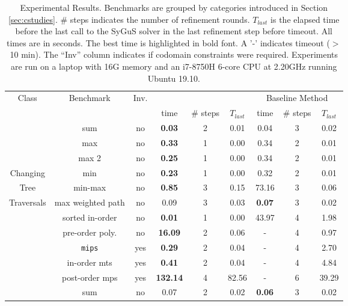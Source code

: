 \begin{table}
	\caption{Experimental Results.  Benchmarks are grouped by categories introduced in Section \ref{sec:cstudies}. \# steps indicates the number of refinement rounds. $T_{last}$ is the elapsed time before the last call to the SyGuS solver in the last refinement step before timeout. All times are in seconds. The best time is highlighted in bold font.  A '-' indicates timeout ($>$ 10 min). The ``Inv'' column indicates if codomain constraints were required. Experiments are run on a laptop with 16G memory and an i7-8750H 6-core CPU at 2.20GHz running Ubuntu 19.10.}\label{table:experiments}
	{
		\begin{tabular}[h]{|c|c|c|c|c|c||c|c|c|}
			\hline
			 \multirow{2}{*}{Class} &                 \multirow{2}{*}{Benchmark} &                   \multirow{2}{*}{Inv.} &                    \multicolumn{3}{c||}{\tool} &                     \multicolumn{3}{c|}{Baseline Method}\\ 
			\cline{4-9}
			 &   & & time & \# steps & $T_{last}$ & time & \# steps & $T_{last}$\\ 
			\hline
			 & sum & no & {\bfseries 0.03} & 2 & 0.01 & 0.04 & 3 & 0.02\\ 
			 & max & no & {\bfseries 0.33} & 1 & 0.00 & 0.34 & 2 & 0.01\\ 
			 & max 2 & no & {\bfseries 0.25} & 1 & 0.00 & 0.34 & 2 & 0.01\\ 
			Changing & min & no & {\bfseries 0.23} & 1 & 0.00 & 0.32 & 2 & 0.01\\ 
			Tree & min-max & no & {\bfseries 0.85} & 3 & 0.15 & 73.16 & 3 & 0.06\\ 
			Traversals & max weighted path & no & 0.09 & 3 & 0.03 & {\bfseries 0.07} & 3 & 0.02\\ 
			 & sorted in-order & no & {\bfseries 0.01} & 1 & 0.00 & 43.97 & 4 & 1.98\\ 
			 & pre-order poly. & no & {\bfseries 16.09} & 2 & 0.06 & - & 4 & 0.97\\ 
			 & {\tt mips} & yes & {\bfseries 0.29} & 2 & 0.04 & - & 4 & 2.70\\ 
			 & in-order mts & yes & {\bfseries 0.41} & 2 & 0.04 & - & 4 & 4.84\\ 
			 & post-order mps & yes & {\bfseries 132.14} & 4 & 82.56 & - & 6 & 39.29\\ 
			\hline
			 & sum & no & 0.07 & 2 & 0.02 & {\bfseries 0.06} & 3 & 0.02\\ 

\end{tabular}}
\end{table}
